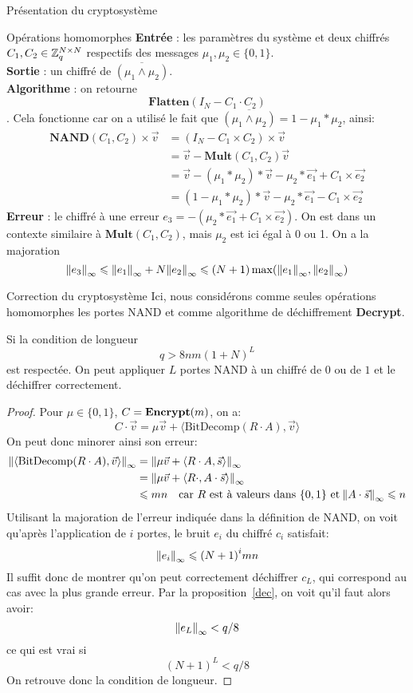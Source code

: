 \begin{section}{Présentation du cryptosystème}
\begin{subsection}{Opérations homomorphes}
	\textbf{Entrée} : les paramètres du système et deux chiffrés $C_1, C_2 \in \mathbb{Z}_q^{N \times N}$ respectifs des messages $\mu_1, \mu_2 \in \{ 0,1\}$.\\
	\textbf{Sortie} : un chiffré de $\overline{(\mu_1 \land \mu_2)}$. \\
	\textbf{Algorithme} : on retourne \[\textbf{Flatten}(I_N - C_1 \cdot C_2)\].
	Cela fonctionne car on a utilisé le fait que $\overline{(\mu_1 \land \mu_2)} = 1 - \mu_1 * \mu_2$, ainsi:
	\begin{align*}
	\textbf{NAND}(C_1, C_2) \times \vec{v} &= (I_N - C_1 \times C_2) \times \vec{v} \\
	&= \vec{v} - \textbf{Mult}(C_1, C_2)\vec{v} \\
	&= \vec{v} - (\mu_1 * \mu_2) * \vec{v} - \mu_2 * \vec{e_1} + C_1 \times \vec{e_2} \\
	&= (1 - \mu_1 * \mu_2) * \vec{v} - \mu_2 * \vec{e_1} - C_1 \times \vec{e_2}
	\end{align*}
	\textbf{Erreur} : le chiffré à une erreur 
	$e_3 = -(\mu_2 * \vec{e_1} + C_1 \times \vec{e_2})$. On est dans 
	un contexte similaire à $\textbf{Mult}(C_1, C_2)$, mais 
	$\mu_2$ est ici égal à 0 ou 1. On a la majoration
\[{\|e_3\|}_{\infty} \leqslant {\|e_1\|}_{\infty} + N {\|e_2\|}_{\infty} \leqslant (N+1) \max({\|e_1\|}_{\infty}, {\|e_2\|}_{\infty})\]
	\end{subsection}
	\begin{subsection}{Correction du cryptosystème}
	Ici, nous considérons comme seules opérations homomorphes les portes
	NAND et comme algorithme de déchiffrement \textbf{Decrypt}.
	\begin{prop}
	Si la condition de longueur 
	\[q > 8nm (1 + N)^L \]
	est respectée. On peut appliquer $L$ portes NAND à un chiffré
	de $0$ ou de $1$ et le déchiffrer correctement.
	\end{prop}
	\begin{proof}
	Pour $\mu \in \{0,1\}$, $C = \text{\textbf{Encrypt}}(m)$, on a:
	\[
	C\cdot \vec{v} = \mu \vec{v} + \langle \text{BitDecomp}(R\cdot A), \vec{v} \rangle 
	\]
	On peut donc minorer ainsi son erreur:
	\begin{align*}
	{\|\langle \text{BitDecomp}(R\cdot A), \vec{v} \rangle\|}_{\infty}
	&= {\|\mu \vec{v} + \langle R\cdot A, \vec{s} \rangle\|}_{\infty}\\
	&= {\|\mu \vec{v} + \langle R\cdot , A\cdot \vec{s} \rangle\|}_{\infty} \\
	&\leqslant  m n \quad {\displaystyle \text{car $R$ est à valeurs dans $\{0,1\}$ et}
	\: {\|A\cdot\vec{s}\|}_{\infty} \leqslant n}
	\end{align*}
	Utilisant la majoration de l'erreur indiquée dans la définition de
	NAND, on voit qu'après l'application de $i$ portes, le bruit $e_i$ du
	chiffré  $c_i$ satisfait:
	\[ {\|e_i\|}_{\infty} \leqslant {(N+1)}^i  mn \]
	Il suffit donc de montrer qu'on peut correctement déchiffrer
	$c_L$, qui correspond au cas avec la plus grande erreur. Par la proposition~\ref{dec}, on voit qu'il faut alors avoir:
	\[ {\|e_L\|}_{\infty} < q/8 \] 
	ce qui est vrai si
	\[ {(N+1)}^L < q/8 \]
	On retrouve donc la condition de longueur.
	\end{proof}
	\end{subsection}
\end{section}
